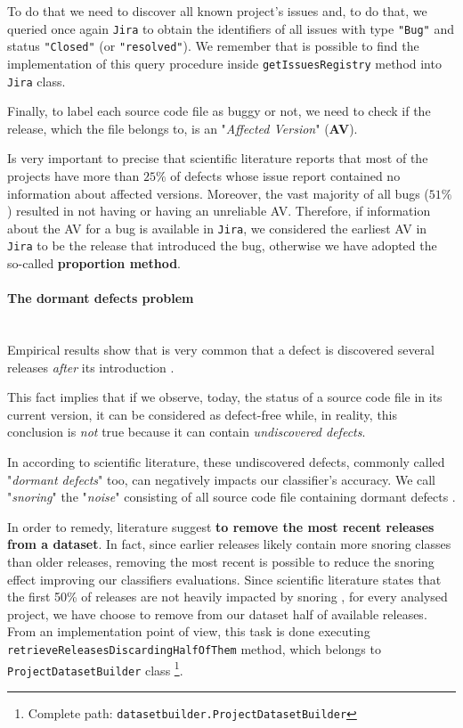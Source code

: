 \documentclass[sigconf]{acmart}
\begin{document}
To do that we need to discover all known project's issues and, to do that, we queried once again \texttt{Jira} to obtain the identifiers of all issues with type \texttt{"Bug"} and status \texttt{"Closed"} (or \texttt{"resolved"}). We remember that is possible to find the implementation of this query procedure inside \texttt{get\-Issues\-Registry} method into \texttt{Jira} class.

Finally, to label each source code file as buggy or not, we need to check if the release, which the file belongs to, is an "\textit{Affected Version}" (\textbf{AV}).

Is very important to precise that scientific literature reports that most of the projects have more than $25\%$ of defects whose issue report contained no information about affected versions. Moreover, the vast majority of all bugs ($51\%$) resulted in not having or having an unreliable AV. Therefore, if information about the AV for a bug is available in \texttt{Jira}, we considered the earliest AV in \texttt{Jira} to be the release that introduced the bug, otherwise we have adopted the so-called \textbf{proportion method}.

\paragraph{The dormant defects problem}
\hfill\\
Empirical results show that is very common that a defect is discovered several releases \textit{after} its introduction \citep{Falessi}. 

This fact implies that if we observe, today, the status of a source code file in its current version, it can be considered as defect-free while, in reality, this conclusion is \textit{not} true because it can contain \textit{undiscovered defects}.

In according to scientific literature, these undiscovered defects, commonly called "\textit{dormant defects}" too, can negatively impacts our classifier's accuracy. We call "\textit{snoring}" the "\textit{noise}" consisting of all source code file containing dormant defects \citep{Falessi}.

In order to remedy, literature suggest \textbf{to remove the most recent releases from a dataset}. In fact, since earlier releases likely contain more snoring classes than older releases, removing the most recent is possible to reduce the snoring effect improving our classifiers evaluations. Since scientific literature states that the first 50\% of releases are not heavily impacted by snoring \citep{Falessi}, for every analysed project, we have choose to remove from our dataset half of available releases. From an implementation point of view, this task is done executing \texttt{retrieve\-Releases\-Discarding\-HalfOfThem} method, which belongs to \texttt{Project\-Dataset\-Builder} class \footnote{Complete path: \texttt{datasetbuilder.ProjectDatasetBuilder}}.
\end{document}
